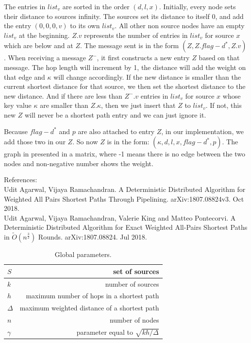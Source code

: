 \documentclass[11pt]{article}  %
\begin{document}
The entries in $list_v$ are sorted in the order $(d,l,x)$. Initially, every node sets their distance to sources infinity. The sources set its distance to itself 0, and add the entry $(0,0,0,v)$ to its own $list_v$. All other non source nodes have an empty $list_v$ at the beginning. $Z.v$ represents the number of entries in $list_v$ for source $x$ which are below and at $Z$. The message sent is in the form $(Z,Z.flag-d^*,Z.v)$. When receiving a message $Z^-$, it first constructs a new entry $Z$ based on that message. The hop length will increment by 1, the distance will add the weight on that edge and $\kappa$ will change accordingly. If the new distance is smaller than the current shortest distance for that source, we then set the shortest distance to the new distance. And if there are less than $Z^-.v$ entries in $list_v$ for source $x$ whose key value $\kappa$ are smaller than $Z.\kappa$, then we just insert that $Z$ to $list_v$. If not, this new $Z$ will never be a shortest path entry and we can just ignore it. \par

Because $flag-d^*$ and $p$ are also attached to entry $Z$, in our implementation, we add those two in our $Z$. So now $Z$ is in the form: $(\kappa, d, l, x, flag-d^*, p)$. The graph in presented in a matrix, where -1 means there is no edge between the two nodes and non-negative number shows the weight. \par
\noindent
References: \\
\noindent
Udit Agarwal, Vijaya Ramachandran. A Deterministic Distributed Algorithm for Weighted All Pairs Shortest Paths Through Pipelining. arXiv:1807.08824v3. Oct 2018.\\
Udit Agarwal, Vijaya Ramachandran, Valerie King and Matteo Pontecorvi. A Deterministic Distributed Algorithm for Exact Weighted All-Pairs Shortest Paths in $\widetilde{O}(n^\frac{3}{2})$ Rounds. 	arXiv:1807.08824. Jul 2018.

\begin{table}[h!]
  \begin{center}
    \caption{Global parameters.}
    \begin{tabular}{l|r} %
      \hline
      $S$ & set of sources\\
      \hline
      $k$ & number of sources\\
      \hline
      $h$ & maximum number of hops in a shortest path\\
      \hline
      $\Delta$ & maximum weighted distance of a shortest path\\
      \hline
      $n$ & number of nodes\\
      \hline
      $\gamma$ & parameter equal to $\sqrt{kh/\Delta}$\\
    \end{tabular}
  \end{center}
\end{table}
\end{document}
